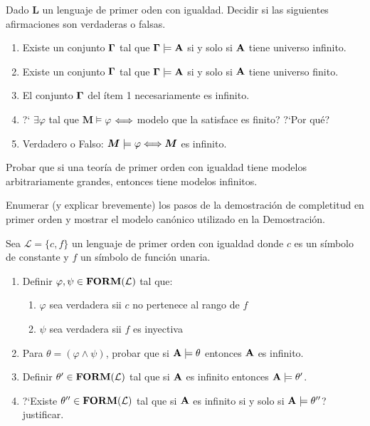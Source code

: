 \documentclass[leqno, 12pt, twoside,letterpaper]{book}
\begin{document}
\begin{ej}{4}
    Dado $\bm{L}$ un lenguaje de primer oden con igualdad. Decidir si las
    siguientes afirmaciones son verdaderas o falsas.

    \begin{enumerate}
        \item Existe un conjunto $\mathbf{\Gamma}$ tal que $\mathbf{\Gamma} \models \mathbf{A}$ si  y
            solo si $\mathbf{A}$ tiene universo infinito.
        \item Existe un conjunto $\mathbf{\Gamma}$ tal que $\mathbf{\Gamma} \models \mathbf{A}$ si y
            solo si $\mathbf{A}$ tiene universo finito.
        \item El conjunto $\mathbf{\Gamma}$ del ítem 1 necesariamente es infinito.
    	\item ?` $\exists\varphi$ tal que $\bm{M} \models \varphi$ $\Longleftrightarrow$ modelo que la satisface es finito? ?`Por qué?
    	\item  Verdadero o Falso: $\bm{M} \models \varphi \Longleftrightarrow \bm{M}$ es infinito.
    \end{enumerate}

\end{ej}


\begin{ej}{2}
    Probar que si una teoría de primer orden con igualdad tiene modelos
    arbitrariamente grandes, entonces tiene modelos infinitos.
\end{ej}

\begin{ej}{1}
   Enumerar (y explicar brevemente) los pasos de la demostración de completitud
    en primer orden y mostrar el modelo canónico utilizado en la Demostración.
\end{ej}

\begin{ej}{1}
    Sea $\mathcal{L} = \{c, f\}$ un lenguaje de primer orden con igualdad donde
    $c$ es un símbolo de constante y $f$ un símbolo de función unaria.
    \begin{enumerate}
        \item Definir $\varphi, \psi \in \mathbf{FORM}(\mathcal{L})$ tal que:
            \begin{enumerate}
                \item $\varphi$ sea verdadera sii $c$ no pertenece al rango de
                    $f$
                \item $\psi$ sea verdadera sii $f$ es inyectiva
            \end{enumerate}
        \item Para $\theta = (\varphi \land \psi)$, probar que si $\mathbf{A} \models
            \theta$ entonces $\mathbf{A}$ es infinito.
        \item Definir $\theta' \in \mathbf{FORM}(\mathcal{L})$ tal que si $\mathbf{A}$ es
            infinito entonces $\mathbf{A} \models \theta'$.
        \item ?`Existe $\theta'' \in \mathbf{FORM}(\mathcal{L})$ tal que si $\mathbf{A}$ es
            infinito si y solo si $\mathbf{A} \models \theta''$? justificar.
    \end{enumerate}
\end{ej}


\printindex
\end{document}
